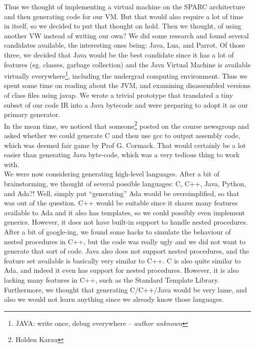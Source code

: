 \documentclass[onecolumn,11pt]{article}
\begin{document}
Thus we thought of implementing a virtual machine on the SPARC architecture and then generating code for our VM. But that would also require a lot of time in itself, so we decided to put that thought on hold. Then we thought, of using another VW instead of writing our own? We did some research and found several candidates available, the interesting ones being: Java, Lua, and Parrot. Of those three, we decided that Java would be the best candidate since it has a lot of features (eg. classes, garbage collection) and the Java Virtual Machine is available virtually everywhere\footnote{JAVA: write once, debug everywhere -- \emph{author unknown}}, including the undergrad computing environment. Thus we spent some time on reading about the JVM, and examining disassembled versions of class files using javap. We wrote a trivial prototype that translated a tiny subset of our code IR into a Java bytecode and were preparing to adopt it as our primary generator. \\

In the mean time, we noticed that someone\footnote{Holden Karau} posted on the course newsgroup and asked whether we could generate C and then use gcc to output assembly code, which was deemed fair game by Prof G. Cormack. That would certainly be a lot easier than generating Java byte-code, which was a very tedious thing to work with. \\

We were now considering generating high-level languages. After a bit of brainstorming, we thought of several possible languages: C, C++, Java, Python, and Ada?! Well, simply put ``generating'' Ada would be oversimplified, so that was out of the question. C++ would be suitable since it shares many features available to Ada and it also has templates, so we could possibly even implement generics. However, it does not have built-in support to handle nested procedures. After a bit of google-ing, we found some hacks to simulate the behaviour of nested procedures in C++, but the code was really ugly and we did not want to generate that sort of code. Java also does not support nested procedures, and the feature set available is basically very similar to C++. C is also quite similar to Ada, and indeed it even has support for nested procedures. However, it is also lacking many features in C++, such as the Standard Template Library. Furthermore, we thought that generating C/C++/Java would be very lame, and also we would not learn anything since we already know those languages. \\
\end{document}
